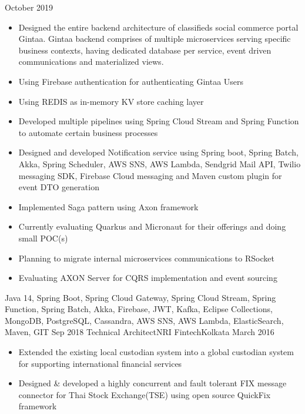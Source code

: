 \begin{experiences}
    {October 2019} {
                      \begin{itemize}
                        \item Designed the entire backend architecture of classifieds social commerce portal Gintaa. Gintaa backend comprises of multiple microservices serving specific business contexts, having dedicated database per service, event driven communications and materialized views.      
                        \item Using Firebase authentication for authenticating Gintaa Users  
                        \item Using REDIS as in-memory KV store caching layer
                        \item Developed multiple pipelines using Spring Cloud Stream and Spring Function to automate certain business processes 
                        \item Designed and developed Notification service using Spring boot, Spring Batch, Akka, Spring Scheduler, AWS SNS, AWS Lambda, Sendgrid Mail API, Twilio messaging SDK, Firebase Cloud messaging and Maven custom plugin for event DTO generation
                        \item Implemented Saga pattern using Axon framework
                        \item Currently evaluating Quarkus and Micronaut for their offerings and doing small POC(s)
                        \item Planning to migrate internal microservices communications to RSocket
                        \item Evaluating AXON Server for CQRS implementation and event sourcing
                      \end{itemize}
                    }
                    {Java 14, Spring Boot, Spring Cloud Gateway, Spring Cloud Stream, Spring Function, Spring Batch, Akka, Firebase, JWT, Kafka, Eclipse Collections, MongoDB, PostgreSQL, Cassandra, AWS SNS, AWS Lambda, ElasticSearch, Maven, GIT}
  \emptySeparator
  \experience
    {Sep 2018}   {Technical Architect}{NRI Fintech}{Kolkata}
    {March 2016} {
                      \begin{itemize}
                        \item Extended the existing local custodian system into a global custodian system for supporting international financial services   
                        \item Designed \& developed a highly concurrent and fault tolerant FIX message connector for Thai Stock Exchange(TSE) using open source QuickFix framework 

\end{itemize}}
\end{experiences}

